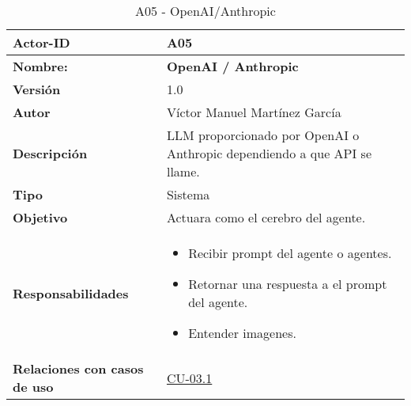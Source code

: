 \begin{table}[H]
	\centering
	\begin{tabularx}{\linewidth}{ p{} p{} }
		\toprule
		\textbf{Actor-ID}    & A05 \\
		\toprule
		\textbf{Nombre: } 			  & \textbf{OpenAI / Anthropic} \\
		\textbf{Versión}              & 1.0    \\
		\textbf{Autor}                & Víctor Manuel Martínez García \\
		\textbf{Descripción}          & LLM proporcionado por OpenAI o Anthropic dependiendo a que API se llame.\\
		\textbf{Tipo}                 & Sistema \\
		\textbf{Objetivo}             & Actuara como el cerebro del agente. \\
		\textbf{Responsabilidades}    & 
		\begin{itemize}
			\tightlist
			\item Recibir prompt del agente o agentes.
            \item Retornar una respuesta a el prompt del agente.
            \item Entender imagenes.
		\end{itemize}\\
		\textbf{Relaciones con casos de uso} & \hyperref[CU-03.1 Interpretar intención del usuario]{CU-03.1}\\
		\bottomrule
	\end{tabularx}
	\caption{A05 - OpenAI/Anthropic}
	\label{actor:OpenAI/Anthropic}
\end{table}


